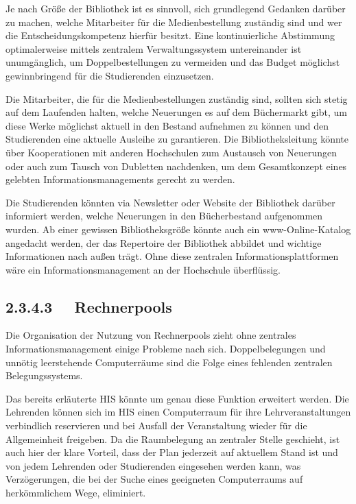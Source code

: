 \documentclass{article}
\begin{document}
\bigskip

Je nach Größe der Bibliothek ist es sinnvoll, sich grundlegend Gedanken darüber zu machen, welche Mitarbeiter für die
Medienbestellung zuständig sind und wer die Entscheidungskompetenz hierfür besitzt. Eine kontinuierliche Abstimmung
optimalerweise mittels zentralem Verwaltungssystem untereinander ist unumgänglich, um Doppelbestellungen zu vermeiden
und das Budget möglichst gewinnbringend für die Studierenden einzusetzen. 


\bigskip

Die Mitarbeiter, die für die Medienbestellungen zuständig sind, sollten sich stetig auf dem Laufenden halten, welche
Neuerungen es auf dem Büchermarkt gibt, um diese Werke möglichst aktuell in den Bestand aufnehmen zu können und den
Studierenden eine aktuelle Ausleihe zu garantieren. Die Bibliotheksleitung könnte über Kooperationen mit anderen
Hochschulen zum Austausch von Neuerungen oder auch zum Tausch von Dubletten nachdenken, um dem Gesamtkonzept eines
gelebten Informationsmanagements gerecht zu werden. 


\bigskip

Die Studierenden könnten via Newsletter oder Website der Bibliothek darüber informiert werden, welche Neuerungen in den
Bücherbestand aufgenommen wurden. Ab einer gewissen Bibliotheksgröße könnte auch ein www-Online-Katalog angedacht
werden, der das Repertoire der Bibliothek abbildet und wichtige Informationen nach außen trägt. Ohne diese zentralen
Informationsplattformen wäre ein Informationsmanagement an der Hochschule überflüssig. 

\subsection[2.3.4.3 \ \ Rechnerpools]{2.3.4.3 \ \ Rechnerpools}
Die Organisation der Nutzung von Rechnerpools zieht ohne zentrales Informationsmanagement einige Probleme nach sich.
Doppelbelegungen und unnötig leerstehende Computerräume sind die Folge eines fehlenden zentralen Belegungssystems. 


\bigskip

Das bereits erläuterte HIS könnte um genau diese Funktion erweitert werden. Die Lehrenden können sich im HIS einen
Computerraum für ihre Lehrveranstaltungen verbindlich reservieren und bei Ausfall der Veranstaltung wieder für die
Allgemeinheit freigeben. Da die Raumbelegung an zentraler Stelle geschieht, ist auch hier der klare Vorteil, dass der
Plan jederzeit auf aktuellem Stand ist und von jedem Lehrenden oder Studierenden eingesehen werden kann, was
Verzögerungen, die bei der Suche eines geeigneten Computerraums auf herkömmlichem Wege, eliminiert. 
\end{document}
